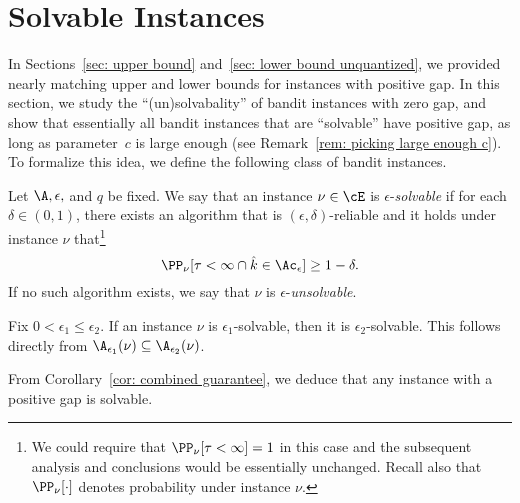 \section{Solvable Instances} 
\label{sec: solvable}
In Sections~\ref{sec: upper bound} and~\ref{sec: lower bound unquantized}, we provided nearly matching upper and lower bounds for instances with positive gap.
In this section, we study the ``(un)solvabality'' of bandit instances with zero gap, and show that essentially all bandit instances that are ``solvable'' have positive gap, as long as parameter~$c$ is large enough (see Remark~\ref{rem: picking large enough c}).
To formalize this idea, we define the following class of bandit instances.



\begin{definition}
\label{def:solvable}
     Let $\A, \epsilon,$ and $q$ be fixed. 
     We say that an instance $\nu \in \cE$ is $\epsilon$-\emph{solvable} if for each $\delta \in (0, 1)$, there exists an algorithm that is $(\epsilon, \delta)$-reliable and it holds under instance $\nu$ that\footnote{We could require that $\PP_{\nu}[\tau < \infty] = 1$ in this case and the subsequent analysis and conclusions would be essentially unchanged.  Recall also that $\PP_{\nu}[\cdot]$ denotes probability under instance $\nu$.}
    \begin{equation}
        \PP_{\nu}[\tau < \infty \cap \hat{k}\in\Ac_{\epsilon}]\ge1-\delta.
    \end{equation}
    If no such algorithm exists, we say that $\nu$ is $\epsilon$-\emph{unsolvable}.
\end{definition}

\begin{remark}
\label{rem: solvable inclusion}
    Fix $0 < \epsilon_1 \le \epsilon_2$. If an instance $\nu$ is
    $\epsilon_1$-solvable, then it is $\epsilon_2$-solvable.
    This follows directly from $\A_{\epsilon_1}(\nu) \subseteq \A_{\epsilon_2}(\nu)$.
\end{remark}

From Corollary~\ref{cor: combined guarantee}, we deduce that any instance with a positive gap is solvable. 
 

